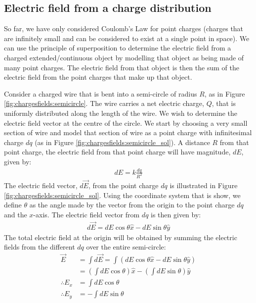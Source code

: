 \subsection{Electric field from a charge distribution}
So far, we have only considered Coulomb's Law for point charges (charges that are infinitely small and can be considered to exist at a single point in space). We can use the principle of superposition to determine the electric field from a charged extended/continuous object by modelling that object as being made of many point charges. The electric field from that object is then the sum of the electric field from the point charges that make up that object. 

Consider a charged wire that is bent into a semi-circle of radius $R$, as in Figure \ref{fig:chargesfields:semicircle}. The wire carries a net electric charge, $Q$, that is uniformly distributed along the length of the wire. We wish to determine the electric field vector at the centre of the circle. 
We start by choosing a very small section of wire and model that section of wire as a point charge with infinitesimal charge $dq$ (as in Figure \ref{fig:chargesfields:semicircle_sol}). A distance $R$ from that point charge, the electric field from that point charge will have magnitude, $dE$, given by:
\begin{align*}
dE=k\frac{dq}{R^2}
\end{align*}
The electric field vector, $d\vec E$, from the point charge $dq$ is illustrated in Figure \ref{fig:chargesfields:semicircle_sol}.
Using the coordinate system that is show, we define $\theta$ as the angle made by the vector from the origin to the point charge $dq$ and the $x$-axis. The electric field vector from $dq$ is then given by:
\begin{align*}
d\vec E = dE\cos\theta \hat x - dE\sin\theta \hat y
\end{align*}
The total electric field at the origin will be obtained by summing the electric fields from the different $dq$ over the entire semi-circle:
\begin{align*}
\vec E &= \int d\vec E = \int \left(dE\cos\theta \hat x - dE\sin\theta \hat y\right)\\
&=\left( \int dE\cos\theta \right)\hat x -\left( \int dE\sin\theta \right)\hat y\\
\therefore E_x &= \int dE\cos\theta\\
\therefore E_y &= -\int dE\sin\theta\\
\end{align*}
